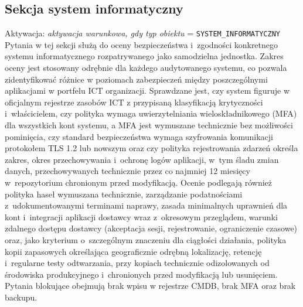 \subsection{Sekcja system informatyczny}
\noindent Aktywacja: \textit{aktywacja warunkowa, gdy typ obiektu} = \texttt{SYSTEM\_INFORMATYCZNY}\\
Pytania w tej sekcji służą do oceny bezpieczeństwa i~zgodności konkretnego systemu informatycznego rozpatrywanego jako samodzielna jednostka. Zakres oceny jest stosowany odrębnie dla każdego audytowanego systemu, co pozwala zidentyfikować różnice w poziomach zabezpieczeń między poszczególnymi aplikacjami w portfelu ICT organizacji. Sprawdzane jest, czy system figuruje w oficjalnym rejestrze zasobów ICT z przypisaną klasyfikacją krytyczności i~właścicielem, czy polityka wymaga uwierzytelniania wieloskładnikowego (MFA) dla wszystkich kont systemu, a MFA jest wymuszane technicznie bez możliwości pominięcia, czy standard bezpieczeństwa wymaga szyfrowania komunikacji protokołem TLS 1.2 lub nowszym oraz czy polityka rejestrowania zdarzeń określa zakres, okres przechowywania i~ochronę logów aplikacji, w~tym śladu zmian danych, przechowywanych technicznie przez co najmniej 12 miesięcy w~repozytorium chronionym przed modyfikacją. Ocenie podlegają również polityka haseł wymuszana technicznie, zarządzanie podatnościami z~udokumentowanymi terminami naprawy, zasada minimalnych uprawnień dla kont i~integracji aplikacji dostawcy wraz z~okresowym przeglądem, warunki zdalnego dostępu dostawcy (akceptacja sesji, rejestrowanie, ograniczenie czasowe) oraz, jako kryterium o~szczególnym znaczeniu dla ciągłości działania, polityka kopii zapasowych określająca geograficznie odrębną lokalizację, retencję i~regularne testy odtwarzania, przy kopiach technicznie odizolowanych od środowiska produkcyjnego i~chronionych przed modyfikacją lub usunięciem. Pytania blokujące obejmują brak wpisu w rejestrze CMDB, brak MFA oraz brak backupu.

